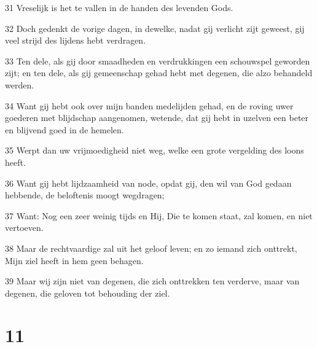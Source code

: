 \par 31 Vreselijk is het te vallen in de handen des levenden Gods.
\par 32 Doch gedenkt de vorige dagen, in dewelke, nadat gij verlicht zijt geweest, gij veel strijd des lijdens hebt verdragen.
\par 33 Ten dele, als gij door smaadheden en verdrukkingen een schouwspel geworden zijt; en ten dele, als gij gemeenschap gehad hebt met degenen, die alzo behandeld werden.
\par 34 Want gij hebt ook over mijn banden medelijden gehad, en de roving uwer goederen met blijdschap aangenomen, wetende, dat gij hebt in uzelven een beter en blijvend goed in de hemelen.
\par 35 Werpt dan uw vrijmoedigheid niet weg, welke een grote vergelding des loons heeft.
\par 36 Want gij hebt lijdzaamheid van node, opdat gij, den wil van God gedaan hebbende, de beloftenis moogt wegdragen;
\par 37 Want: Nog een zeer weinig tijds en Hij, Die te komen staat, zal komen, en niet vertoeven.
\par 38 Maar de rechtvaardige zal uit het geloof leven; en zo iemand zich onttrekt, Mijn ziel heeft in hem geen behagen.
\par 39 Maar wij zijn niet van degenen, die zich onttrekken ten verderve, maar van degenen, die geloven tot behouding der ziel.

\chapter{11}

